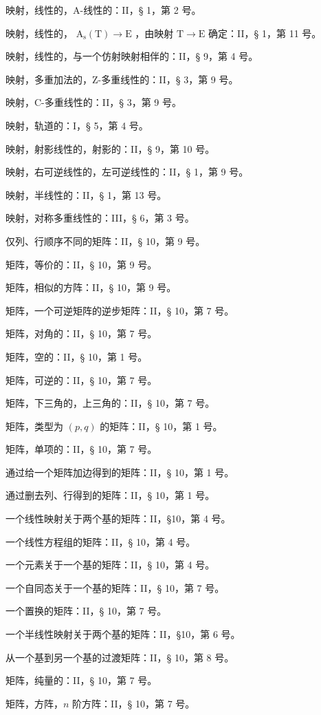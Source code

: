 映射，线性的，A-线性的：II，§ 1，第 2 号。

映射，线性的， \(\mathrm{A_s(T)} \to \mathrm{E}\) ，由映射 \(\mathrm{T} \to \mathrm{E}\) 确定：II，§ 1，第 11 号。

映射，线性的，与一个仿射映射相伴的：II，§ 9，第 4 号。

映射，多重加法的，Z-多重线性的：II，§ 3，第 9 号。

映射，C-多重线性的：II，§ 3，第 9 号。

映射，轨道的：I，§ 5，第 4 号。

映射，射影线性的，射影的：II，§ 9，第 10 号。

映射，右可逆线性的，左可逆线性的：II，§ 1，第 9 号。

映射，半线性的：II，§ 1，第 13 号。

映射，对称多重线性的：III，§ 6，第 3 号。

仅列、行顺序不同的矩阵：II，§ 10，第 9 号。

矩阵，等价的：II，§ 10，第 9 号。

矩阵，相似的方阵：II，§ 10，第 9 号。

矩阵，一个可逆矩阵的逆步矩阵：II，§ 10，第 7 号。

矩阵，对角的：II，§ 10，第 7 号。

矩阵，空的：II，§ 10，第 1 号。

矩阵，可逆的：II，§ 10，第 7 号。

矩阵，下三角的，上三角的：II，§ 10，第 7 号。

矩阵，类型为 \((p,q)\) 的矩阵：II，§ 10，第 1 号。

矩阵，单项的：II，§ 10，第 7 号。

通过给一个矩阵加边得到的矩阵：II，§ 10，第 1 号。

通过删去列、行得到的矩阵：II，§ 10，第 1 号。

一个线性映射关于两个基的矩阵：II，§10，第 4 号。

一个线性方程组的矩阵：II，§ 10，第 4 号。

一个元素关于一个基的矩阵：II，§ 10，第 4 号。

一个自同态关于一个基的矩阵：II，§ 10，第 7 号。

一个置换的矩阵：II，§ 10，第 7 号。

一个半线性映射关于两个基的矩阵：II，§10，第 6 号。

从一个基到另一个基的过渡矩阵：II，§ 10，第 8 号。

矩阵，纯量的：II，§ 10，第 7 号。

矩阵，方阵，\(n\) 阶方阵：II，§ 10，第 7 号。

